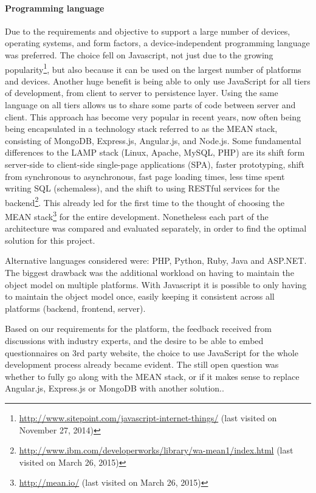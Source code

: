 	\paragraph{Programming language}

		Due to the requirements and objective to support a large number of devices, operating systems, and form factors, a device-independent programming language was preferred. 
		The choice fell on Javascript, not just due to the growing popularity\footnote{\url{http://www.sitepoint.com/javascript-internet-things/} (last visited on November 27, 2014)}, but also because it can be used on the largest number of platforms and devices. Another huge benefit is being able to only use JavaScript for all tiers of development, from client to server to persistence layer. Using the same language on all tiers allows us to share some parts of code between server and client. This approach has become very popular in recent years, now often being being encapsulated in a technology stack referred to as the MEAN stack, consisting of MongoDB, Express.js, Angular.js, and Node.js. Some fundamental differences to the LAMP stack (Linux, Apache, MySQL, PHP) are its shift form server-side to client-side single-page applications (SPA), faster prototyping, shift from synchronous to asynchronous, fast page loading times, less time spent writing SQL (schemaless), and the shift to using RESTful services for the backend\footnote{\url{http://www.ibm.com/developerworks/library/wa-mean1/index.html} (last visited on March 26, 2015)}. This already led for the first time to the thought of choosing the MEAN stack\footnote{\url{http://mean.io/} (last visited on March 26, 2015)} for the entire development. Nonetheless each part of the architecture was compared and evaluated separately, in order to find the optimal solution for this project.

		Alternative languages considered were: PHP, Python, Ruby, Java and ASP.NET. The biggest drawback was the additional workload on having to maintain the object model on multiple platforms. With Javascript it is possible to only having to maintain the object model once, easily keeping it consistent across all platforms (backend, frontend, server).

		Based on our requirements for the platform, the feedback received from discussions with industry experts, and the desire to be able to embed questionnaires on 3rd party website, the choice to use JavaScript for the whole development process already became evident. The still open question was whether to fully go along with the MEAN stack, or if it makes sense to replace Angular.js, Express.js or MongoDB with another solution..


